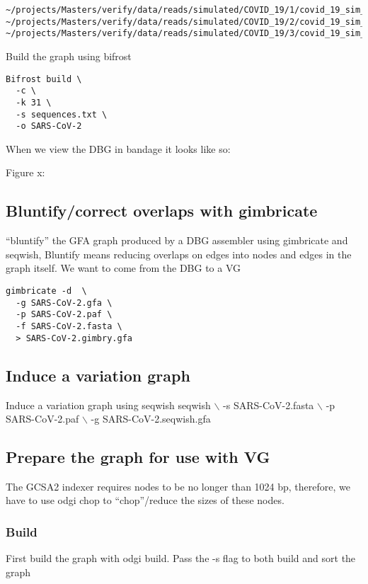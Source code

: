 \documentclass[11pt]{article}
\begin{document}
\begin{verbatim}
~/projects/Masters/verify/data/reads/simulated/COVID_19/1/covid_19_sim_1_interleaved.fastq
~/projects/Masters/verify/data/reads/simulated/COVID_19/2/covid_19_sim_2_interleaved.fastq
~/projects/Masters/verify/data/reads/simulated/COVID_19/3/covid_19_sim_3_interleaved.fastq
\end{verbatim}

Build the graph using bifrost

\begin{verbatim}
Bifrost build \
  -c \
  -k 31 \
  -s sequences.txt \
  -o SARS-CoV-2
\end{verbatim}

When we view the DBG in bandage it looks like so:

Figure x:
\subsection{Bluntify/correct overlaps with gimbricate}
\label{sec:org3faadf1}
“bluntify” the GFA graph produced by a DBG assembler using gimbricate and seqwish, Bluntify means reducing overlaps on edges into nodes and edges in the graph itself.
We want to come from the DBG to a VG

\begin{verbatim}
gimbricate -d  \
  -g SARS-CoV-2.gfa \
  -p SARS-CoV-2.paf \
  -f SARS-CoV-2.fasta \
  > SARS-CoV-2.gimbry.gfa
\end{verbatim}

\subsection{Induce a variation graph}
\label{sec:orgb7bca38}
Induce a variation graph using seqwish
seqwish $\backslash$
  -s SARS-CoV-2.fasta $\backslash$
  -p SARS-CoV-2.paf $\backslash$
  -g SARS-CoV-2.seqwish.gfa

\subsection{Prepare the graph for use with VG}
\label{sec:org03a4171}
The GCSA2 indexer requires nodes to be no longer than 1024 bp, therefore, we have to use odgi chop to “chop”/reduce the sizes of these nodes.
\subsubsection{Build}
\label{sec:orgac8e624}
First build the graph with odgi build. Pass the -s flag to both build and sort the graph
\end{document}
